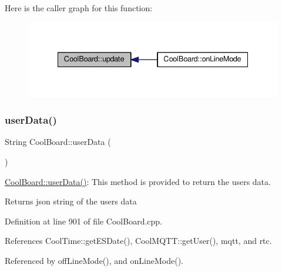 Here is the caller graph for this function\+:
\nopagebreak
\begin{figure}[H]
\begin{center}
\leavevmode
\includegraphics[width=335pt]{classCoolBoard_a8612756d3f73198cdde857a66f0fe690_icgraph}
\end{center}
\end{figure}
\mbox{\label{classCoolBoard_ae7358fb6e623cfc81b775f5f1734909b}} 
\subsubsection{\texorpdfstring{user\+Data()}{userData()}}
{\footnotesize\ttfamily String Cool\+Board\+::user\+Data (\begin{DoxyParamCaption}{ }\end{DoxyParamCaption})}

\hyperlink{classCoolBoard_ae7358fb6e623cfc81b775f5f1734909b}{Cool\+Board\+::user\+Data()}\+: This method is provided to return the user\textquotesingle{}s data.

\begin{DoxyReturn}{Returns}
json string of the user\textquotesingle{}s data 
\end{DoxyReturn}


Definition at line 901 of file Cool\+Board.\+cpp.



References Cool\+Time\+::get\+E\+S\+Date(), Cool\+M\+Q\+T\+T\+::get\+User(), mqtt, and rtc.



Referenced by off\+Line\+Mode(), and on\+Line\+Mode().


